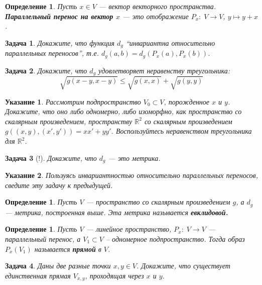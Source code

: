 \documentclass[12pt]{book}
\def\R{{\mathbb R}}
\theoremstyle{upshape}
\newtheorem{zadacha}{Задача}[chapter]
\theoremstyle{generic}
\newtheorem{opredelenie}[teorema]{Определение}
\theoremstyle{upshapenonumber}
\newtheorem{ukazanie}{Указание}[section]
\newcommand{\следствие}{%
     \refstepcounter{teorema}
     {\noindent\bf Следствие \thechapter.\arabic{teorema}:\ }}
\newcommand{\пример}{%
     \refstepcounter{teorema}
     {\noindent\bf Пример \thechapter.\arabic{teorema}:\ }}
\newcommand{\лемма}{%
     \refstepcounter{teorema}
     {\noindent\bf Лемма \thechapter.\arabic{teorema}:\ }}
\newcommand{\теорема}{%
     \refstepcounter{teorema}
     {\noindent\bf Теорема \thechapter.\arabic{teorema}:\ }}
\newcommand{\утверждение}{%
     \refstepcounter{teorema}
     {\noindent\bf Утверждение \thechapter.\arabic{teorema}:\ }}
\begin{document}
{\begin{opredelenie} Пусть $x\in V$ --- вектор векторного пространства.
{\bf Параллельный перенос на вектор $x$} --- это отображение $P_x:\;
V \to V$, $y\mapsto y+x$.
\end{opredelenie}

\begin{zadacha} Докажите, что функция $d_g$ ``инвариантна
относительно параллельных переносов'', т.е.  $d_g(a, b) = d_g
(P_x(a), P_x(b))$.
\end{zadacha}

\begin{zadacha} Докажите, что  $d_g$ удовлетворяет 
неравенству треугольника:
$$
\sqrt{g(x-y,x-y)} \leq \sqrt{g(x,x)}+ \sqrt{g(y,y)}
$$
\end{zadacha}

\begin{ukazanie} Рассмотрим подпространство
$V_0 \subset V$, порожденное $x$ и $y$. Докажите, что оно 
либо одномерно, либо изоморфно,
как пространство со скалярным произведением, пространству $\R^2$ со
скалярным произведением $g((x,y), (x', y')) = xx' + yy'$.
Воспользуйтесь неравенством треугольника для $\R^2$.
\end{ukazanie}

\begin{zadacha}[!] Докажите, что $d_g$ --- это метрика.
\end{zadacha}

\begin{ukazanie} Пользуясь инвариантностью относительно
параллельных переносов, сведите эту задачу к предыдущей.
\end{ukazanie}

\begin{opredelenie} Пусть $V$ --- пространство со скалярным
произведением $g$, а $d_g$ --- метрика, построенная выше. Эта метрика
называется {\bf евклидовой.}
\end{opredelenie}

\begin{opredelenie} Пусть $V$ --- линейное пространство,
$P_x: \; V \to V$ --- параллельный перенос, а $V_1\subset V$ --
одномерное подпространство. Тогда образ $P_x(V_1)$ называется {\bf
прямой} в $V$.
\end{opredelenie}

\begin{zadacha} Даны две разные точки $x, y \in V$. Докажите, что
существует единственная прямая $V_{x,y}$, проходящая через $x$ и
$y$.
\end{zadacha}

}
\end{document}
